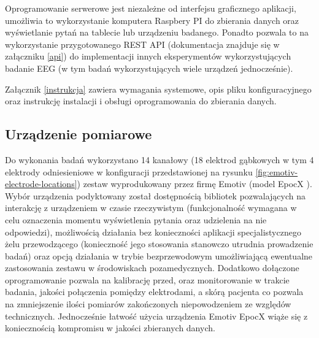 \documentclass{./assets/wfis}
\begin{document}
Oprogramowanie serwerowe jest niezależne od interfejsu graficznego aplikacji, umożliwia to wykorzystanie komputera Raspbery PI do zbierania danych oraz wyświetlanie pytań na tablecie lub urządzeniu badanego.
Ponadto pozwala to na wykorzystanie przygotowanego REST API (dokumentacja znajduje się w załączniku \ref{api}) do implementacji innych eksperymentów wykorzystujących badanie EEG (w tym badań wykorzystujących wiele urządzeń jednocześnie). 

Załącznik \ref{instrukcja} zawiera wymagania systemowe, opis pliku konfiguracyjnego oraz instrukcję instalacji i obsługi oprogramowania do zbierania danych.
\clearpage

\subsection{Urządzenie pomiarowe}\label{emotiv}
Do wykonania badań wykorzystano 14 kanałowy (18 elektrod gąbkowych w tym 4 elektrody odniesieniowe w konfiguracji przedstawionej na rysunku \ref{fig:emotiv-electrode-locations}) zestaw wyprodukowany przez firmę Emotiv (model EpocX \cite{emotiv_inc_epoc_nodate}). Wybór urządzenia podyktowany został dostępnością bibliotek pozwalających na interakcję z urządzeniem w czasie rzeczywistym \cite{emotiv_inc_emotiv_nodate-1} (funkcjonalność wymagana w celu oznaczenia momentu wyświetlenia pytania oraz udzielenia na nie odpowiedzi), możliwością działania bez konieczności aplikacji specjalistycznego żelu przewodzącego (konieczność jego stosowania stanowczo utrudnia prowadzenie badań) oraz opcją działania w trybie bezprzewodowym umożliwiającą ewentualne zastosowania zestawu w środowiskach pozamedycznych. Dodatkowo dołączone oprogramowanie pozwala na kalibrację przed, oraz monitorowanie w trakcie badania, jakości połączenia pomiędzy elektrodami, a skórą pacjenta co pozwala na zmniejszenie ilości pomiarów zakończonych niepowodzeniem ze względów technicznych. Jednocześnie łatwość użycia urządzenia Emotiv EpocX wiąże się z koniecznością kompromisu w jakości zbieranych danych. 

\end{document}
